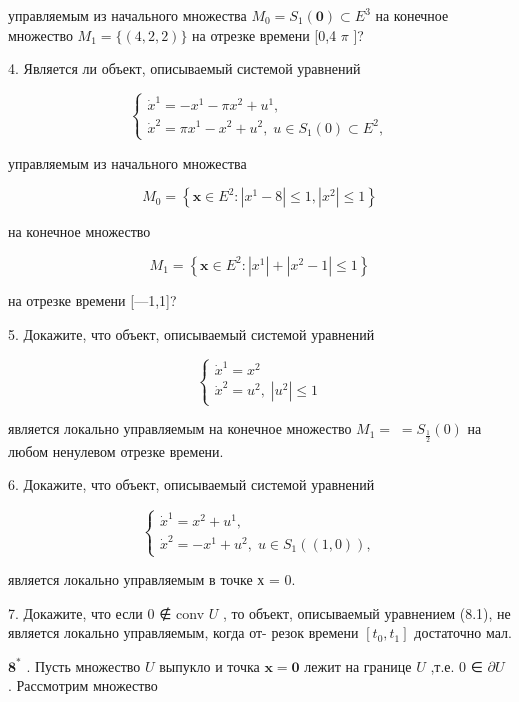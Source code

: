 \documentclass[8pt]{extarticle}
\begin{document}
управляемым из начального множества \({M}_{0} = {S}_{1}\left( \mathbf{0}\right)  \subset  {E}^{3}\) на конечное множество \({M}_{1} = \{ \left( {4,2,2}\right) \}\) на отрезке времени [0,4 \(\pi\) ]?

4. Является ли объект, описываемый системой уравнений

\[
\left\{  \begin{array}{l} {\dot{x}}^{1} =  - {x}^{1} - \pi {x}^{2} + {u}^{1}, \\  {\dot{x}}^{2} = \pi {x}^{1} - {x}^{2} + {u}^{2},\;u \in  {S}_{1}\left( 0\right)  \subset  {E}^{2}, \end{array}\right.
\]

управляемым из начального множества

\[
{M}_{0} = \left\{  {\mathbf{x} \in  {E}^{2} : \left| {{x}^{1} - 8}\right|  \leq  1,\left| {x}^{2}\right|  \leq  1}\right\}
\]

на конечное множество

\[
{M}_{1} = \left\{  {\mathbf{x} \in  {E}^{2} : \left| {x}^{1}\right|  + \left| {{x}^{2} - 1}\right|  \leq  1}\right\}
\]

на отрезке времени [—1,1]?

5. Докажите, что объект, описываемый системой уравнений

\[
\left\{  \begin{array}{l} {\dot{x}}^{1} = {x}^{2} \\  {\dot{x}}^{2} = {u}^{2},\;\left| {u}^{2}\right|  \leq  1 \end{array}\right.
\]

является локально управляемым на конечное множество \({M}_{1} = \; = {S}_{\frac{1}{2}}\left( 0\right)\) на любом ненулевом отрезке времени.

6. Докажите, что объект, описываемый системой уравнений

\[
\left\{  \begin{array}{l} {\dot{x}}^{1} = {x}^{2} + {u}^{1}, \\  {\dot{x}}^{2} =  - {x}^{1} + {u}^{2},\;u \in  {S}_{1}\left( \left( {1,0}\right) \right) , \end{array}\right.
\]

является локально управляемым в точке х = 0.

7. Докажите, что если 0 ∉ conv \(U\) , то объект, описываемый уравнением (8.1), не является локально управляемым, когда от- резок времени \(\left\lbrack  {{t}_{0},{t}_{1}}\right\rbrack\) достаточно мал.

\({\mathbf{8}}^{ * }\) . Пусть множество \(U\) выпукло и точка \(\mathbf{x} = \mathbf{0}\) лежит на границе \(U\) ,т.е. 0 ∈ \(\partial U\) . Рассмотрим множество
\end{document}
